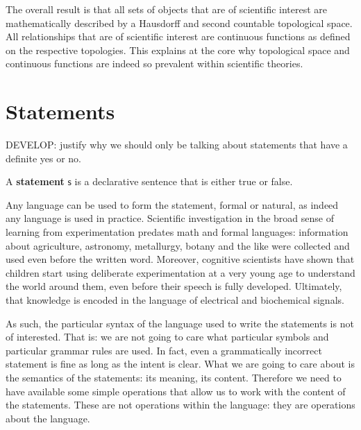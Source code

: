 \documentclass[11pt,letterpaper,fleqn]{memoir} %
\begin{document}
The overall result is that all sets of objects that are of scientific interest are mathematically described by a Hausdorff and second countable topological space. All relationships that are of scientific interest are continuous functions as defined on the respective topologies. This explains at the core why topological space and continuous functions are indeed so prevalent within scientific theories.

\section{Statements}

DEVELOP: justify why we should only be talking about statements that have a definite yes or no.

\begin{mathSection}

\begin{defn}
	A \textbf{statement} $\mathsf{s}$ is a declarative sentence that is either true or false.
\end{defn}

\end{mathSection}

Any language can be used to form the statement, formal or natural, as indeed any language is used in practice. Scientific investigation in the broad sense of learning from experimentation predates math and formal languages: information about agriculture, astronomy, metallurgy, botany and the like were collected and used even before the written word. Moreover, cognitive scientists have shown that children start using deliberate experimentation at a very young age to understand the world around them, even before their speech is fully developed. Ultimately, that knowledge is encoded in the language of electrical and biochemical signals.

As such, the particular syntax of the language used to write the statements is not of interested. That is: we are not going to care what particular symbols and particular grammar rules are used. In fact, even a grammatically incorrect statement is fine as long as the intent is clear. What we are going to care about is the semantics of the statements: its meaning, its content. Therefore we need to have available some simple operations that allow us to work with the content of the statements. These are not operations within the language: they are operations about the language.

\end{document}
